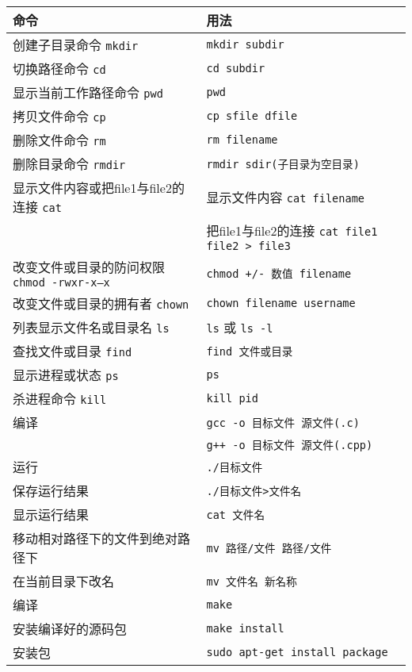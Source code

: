 \documentclass[11pt]{article}
\begin{document}
\begin{table}[htbp]
\centering  %
\begin{tabular}{ll}  %
\hline
命令 & 用法 \\
\hline  %
创建子目录命令 \texttt{mkdir} & \texttt{mkdir subdir} \\
切换路径命令 \texttt{cd} & \texttt{cd subdir} \\
显示当前工作路径命令 \texttt{pwd} & \texttt{pwd} \\
拷贝文件命令 \texttt{cp} & \texttt{cp sfile dfile} \\
删除文件命令 \texttt{rm} & \texttt{rm filename} \\
删除目录命令 \texttt{rmdir} & \texttt{rmdir sdir(子目录为空目录)} \\
显示文件内容或把file1与file2的连接 \texttt{cat} & 显示文件内容 \texttt{cat filename} \\
                                            & 把file1与file2的连接 \texttt{cat file1 file2 > file3} \\
改变文件或目录的防问权限 \texttt{chmod -rwxr-x--x} & \texttt{chmod +/- 数值 filename} \\
改变文件或目录的拥有者 \texttt{chown} & \texttt{chown filename username} \\
列表显示文件名或目录名 \texttt{ls} & \texttt{ls} 或 \texttt{ls -l} \\
查找文件或目录 \texttt{find} & \texttt{find 文件或目录}  \\
显示进程或状态 \texttt{ps} & \texttt{ps} \\
杀进程命令 \texttt{kill} & \texttt{kill pid} \\
编译 & \texttt{gcc -o 目标文件 源文件(.c)} \\
    & \texttt{g++ -o 目标文件 源文件(.cpp)} \\
运行 & \texttt{./目标文件} \\
保存运行结果 & \texttt{./目标文件>文件名} \\
显示运行结果 & \texttt{cat 文件名} \\
移动相对路径下的文件到绝对路径下 & \texttt{mv 路径/文件 路径/文件} \\
在当前目录下改名 & \texttt{mv 文件名 新名称} \\
编译 & \texttt{make} \\
安装编译好的源码包 & \texttt{make install} \\
安装包 & \texttt{sudo apt-get install package} \\

\end{tabular}
\end{table}
\end{document}
